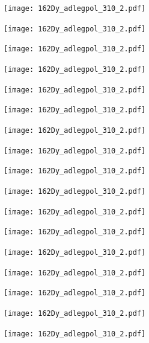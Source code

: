 \begin{center}
\texttt{[image: 162Dy\_adlegpol\_310\_2.pdf]}
\end{center}
\begin{center}
\texttt{[image: 162Dy\_adlegpol\_310\_2.pdf]}
\end{center}
\begin{center}
\texttt{[image: 162Dy\_adlegpol\_310\_2.pdf]}
\end{center}
\begin{center}
\texttt{[image: 162Dy\_adlegpol\_310\_2.pdf]}
\end{center}
\begin{center}
\texttt{[image: 162Dy\_adlegpol\_310\_2.pdf]}
\end{center}
\begin{center}
\texttt{[image: 162Dy\_adlegpol\_310\_2.pdf]}
\end{center}
\begin{center}
\texttt{[image: 162Dy\_adlegpol\_310\_2.pdf]}
\end{center}
\begin{center}
\texttt{[image: 162Dy\_adlegpol\_310\_2.pdf]}
\end{center}
\begin{center}
\texttt{[image: 162Dy\_adlegpol\_310\_2.pdf]}
\end{center}
\begin{center}
\texttt{[image: 162Dy\_adlegpol\_310\_2.pdf]}
\end{center}
\begin{center}
\texttt{[image: 162Dy\_adlegpol\_310\_2.pdf]}
\end{center}
\begin{center}
\texttt{[image: 162Dy\_adlegpol\_310\_2.pdf]}
\end{center}
\begin{center}
\texttt{[image: 162Dy\_adlegpol\_310\_2.pdf]}
\end{center}
\begin{center}
\texttt{[image: 162Dy\_adlegpol\_310\_2.pdf]}
\end{center}
\begin{center}
\texttt{[image: 162Dy\_adlegpol\_310\_2.pdf]}
\end{center}
\begin{center}
\texttt{[image: 162Dy\_adlegpol\_310\_2.pdf]}
\end{center}
\begin{center}
\texttt{[image: 162Dy\_adlegpol\_310\_2.pdf]}
\end{center}
